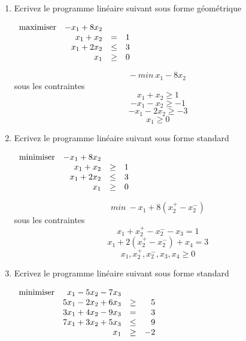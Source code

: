 \begin{enumerate}


  \item Ecrivez  le programme linéaire suivant sous forme géométrique

    $
    \begin{array}{lrcr}
      \mbox{maximiser} & -x_1 + 8 x_2 \\
      & x_1 + x_2 & = & 1\\
      & x_1 + 2x_2 & \leq & 3\\
      & x_1 & \geq & 0
    \end{array}
    $

    \begin{solution}
      $$ -~min ~x_{1}-8x_{2}$$
      sous les contraintes
      $$ x_{1} + x_{2} \geq 1$$
      $$ -x_{1} - x_{2} \geq -1$$
      $$ -x_{1} - 2x_{2} \geq -3$$
      $$ x_{1} \geq 0$$
    \end{solution}


  \item Ecrivez  le programme linéaire suivant sous forme standard

    $
    \begin{array}{lrcr}
      \mbox{minimiser} & -x_1 + 8 x_2 \\
      & x_1 + x_2 & \geq & 1\\
      & x_1 + 2x_2 & \leq & 3\\
      & x_1 & \geq & 0
    \end{array}
    $

    \begin{solution}
      $$ min~ -x_{1} + 8(x_{2}^{+} - x_{2}^{-})$$
      sous les contraintes
      $$x_{1} + x_{2}^{+} - x_{2}^{-} - x_{3} = 1$$
      $$x_{1} + 2(x_{2}^{+} - x_{2}^{-}) + x_{4} = 3$$
      $$x_{1},x_{2}^{+},x_{2}^{-},x_{3}, x_{4} \geq 0$$
    \end{solution}


  \item Ecrivez  le programme linéaire suivant sous forme standard

    $
    \begin{array}{lrcr}
      \mbox{minimiser} & x_1-5x_2-7x_3\\
      & 5x_1-2x_2+6x_3  & \geq & 5\\
      &3x_1+4x_2-9x_3 & = & 3\\
      &7x_1+3x_2+ 5x_3 & \leq & 9\\
      & x_1  & \geq & -2\\
    \end{array}
    $


\end{enumerate}
